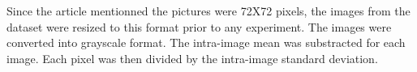 \documentclass{article} %
\begin{document}
Since the article mentionned the pictures were 72X72 pixels, the images from the dataset were resized to this format prior to any experiment. The images were converted into grayscale format. The intra-image mean was substracted for each image. Each pixel was then divided by the intra-image standard deviation.




\end{document}
